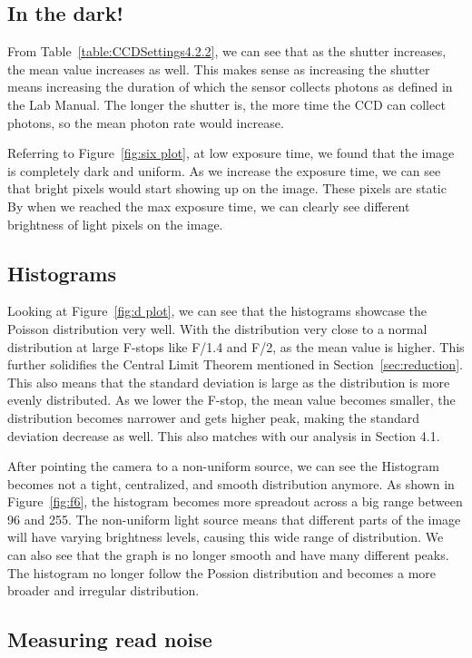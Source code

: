 \documentclass[10pt, preprint]{aastex}
\begin{document}
\subsection{In the dark!}

From Table~\ref{table:CCDSettings4.2.2}, we can see that as the shutter increases, the mean value increases as well. This makes sense as increasing the shutter means increasing the duration of which the sensor collects photons as defined in the Lab Manual. The longer the shutter is, the more time the CCD can collect photons, so the mean photon rate would increase. 

Referring to Figure~\ref{fig:six plot}, at low exposure time, we found that the image is completely dark and uniform. As we increase the exposure time, we can see that bright pixels would start showing up on the image. These pixels are static By when we reached the max exposure time, we can clearly see different brightness of light pixels on the image. 

\subsection{Histograms}

Looking at Figure~\ref{fig:d plot}, we can see that the histograms showcase the Poisson distribution very well. With the distribution very close to a normal distribution at large F-stops like F/1.4 and F/2, as the mean value is higher. This further solidifies the Central Limit Theorem mentioned in Section~\ref{sec:reduction}. This also means that the standard deviation is large as the distribution is more evenly distributed. As we lower the F-stop, the mean value becomes smaller, the distribution becomes narrower and gets higher peak, making the standard deviation decrease as well. This also matches with our analysis in Section 4.1. 

 After pointing the camera to a non-uniform source, we can see the Histogram becomes not a tight, centralized, and smooth distribution anymore. As shown in Figure~\ref{fig:f6}, the histogram becomes more spreadout across a big range between 96 and 255. The non-uniform light source means that different parts of the image will have varying brightness levels, causing this wide range of distribution. We can also see that the graph is no longer smooth and have many different peaks. The histogram no longer follow the Possion distribution and becomes a more broader and irregular distribution.

\subsection{Measuring read noise}
\end{document}

